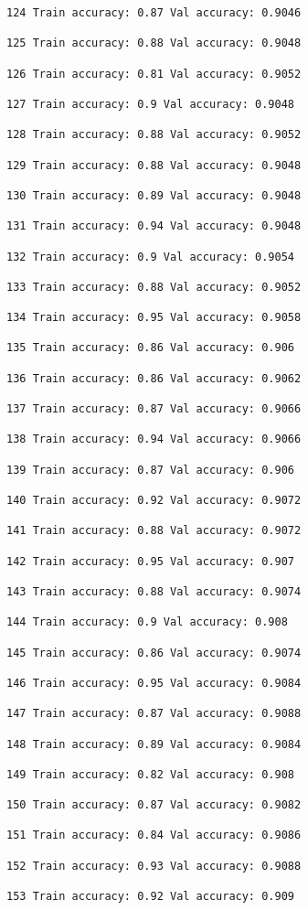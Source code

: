 \documentclass[11pt]{article}
\begin{document}
\begin{Verbatim}[commandchars=\\\{\}]
124 Train accuracy: 0.87 Val accuracy: 0.9046

125 Train accuracy: 0.88 Val accuracy: 0.9048

126 Train accuracy: 0.81 Val accuracy: 0.9052

127 Train accuracy: 0.9 Val accuracy: 0.9048

128 Train accuracy: 0.88 Val accuracy: 0.9052

129 Train accuracy: 0.88 Val accuracy: 0.9048

130 Train accuracy: 0.89 Val accuracy: 0.9048

131 Train accuracy: 0.94 Val accuracy: 0.9048

132 Train accuracy: 0.9 Val accuracy: 0.9054

133 Train accuracy: 0.88 Val accuracy: 0.9052

134 Train accuracy: 0.95 Val accuracy: 0.9058

135 Train accuracy: 0.86 Val accuracy: 0.906

136 Train accuracy: 0.86 Val accuracy: 0.9062

137 Train accuracy: 0.87 Val accuracy: 0.9066

138 Train accuracy: 0.94 Val accuracy: 0.9066

139 Train accuracy: 0.87 Val accuracy: 0.906

140 Train accuracy: 0.92 Val accuracy: 0.9072

141 Train accuracy: 0.88 Val accuracy: 0.9072

142 Train accuracy: 0.95 Val accuracy: 0.907

143 Train accuracy: 0.88 Val accuracy: 0.9074

144 Train accuracy: 0.9 Val accuracy: 0.908

145 Train accuracy: 0.86 Val accuracy: 0.9074

146 Train accuracy: 0.95 Val accuracy: 0.9084

147 Train accuracy: 0.87 Val accuracy: 0.9088

148 Train accuracy: 0.89 Val accuracy: 0.9084

149 Train accuracy: 0.82 Val accuracy: 0.908

150 Train accuracy: 0.87 Val accuracy: 0.9082

151 Train accuracy: 0.84 Val accuracy: 0.9086

152 Train accuracy: 0.93 Val accuracy: 0.9088

153 Train accuracy: 0.92 Val accuracy: 0.909


\end{Verbatim}
\end{document}
